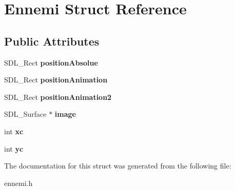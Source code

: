 \hypertarget{structEnnemi}{}\section{Ennemi Struct Reference}
\label{structEnnemi}
\subsection*{Public Attributes}
\begin{DoxyCompactItemize}
\item 
S\+D\+L\+\_\+\+Rect {\bfseries position\+Absolue}\hypertarget{structEnnemi_a38314184da044b6e4a8e9f96775bd94c}{}\label{structEnnemi_a38314184da044b6e4a8e9f96775bd94c}

\item 
S\+D\+L\+\_\+\+Rect {\bfseries position\+Animation}\hypertarget{structEnnemi_a4a74d21ed34168494725b9bf9eb426cd}{}\label{structEnnemi_a4a74d21ed34168494725b9bf9eb426cd}

\item 
S\+D\+L\+\_\+\+Rect {\bfseries position\+Animation2}\hypertarget{structEnnemi_a75b7d9809636f06ebc34c26cdc3d262b}{}\label{structEnnemi_a75b7d9809636f06ebc34c26cdc3d262b}

\item 
S\+D\+L\+\_\+\+Surface $\ast$ {\bfseries image}\hypertarget{structEnnemi_aaa6f9be660b13c562cc72213abe89c92}{}\label{structEnnemi_aaa6f9be660b13c562cc72213abe89c92}

\item 
int {\bfseries xc}\hypertarget{structEnnemi_a1800de4b1f1e7aa74b83095f84569e44}{}\label{structEnnemi_a1800de4b1f1e7aa74b83095f84569e44}

\item 
int {\bfseries yc}\hypertarget{structEnnemi_a9777d93cfaccefa3f05812608d16932a}{}\label{structEnnemi_a9777d93cfaccefa3f05812608d16932a}

\end{DoxyCompactItemize}


The documentation for this struct was generated from the following file\+:\begin{DoxyCompactItemize}
\item 
ennemi.\+h\end{DoxyCompactItemize}
